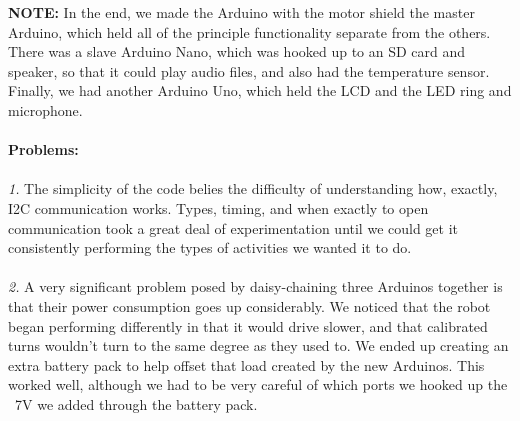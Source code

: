 \documentclass[paper=a4, fontsize=11pt]{scrartcl}
\numberwithin{equation}{section}		%
\numberwithin{figure}{section}			%
\numberwithin{table}{section}				%
\begin{document}
{\textbf{NOTE: }In the end, we made the Arduino with the motor shield the master Arduino,  which held all of the principle functionality separate from the others. There was a slave Arduino Nano, which was hooked up to an SD card and speaker, so that it could play audio files, and also had the temperature sensor. Finally, we had another Arduino Uno, which held the LCD and the LED ring and microphone.
\\\\
\textbf{Problems: }\\\\
\textit{1. } The simplicity of the code belies the difficulty of understanding how, exactly, I2C communication works. Types, timing, and when exactly to open communication took a great deal of experimentation until we could get it consistently performing the types of activities we wanted it to do.
\\\\
\textit{2. }A very significant problem posed by daisy-chaining three Arduinos together is that their power consumption goes up considerably. We noticed that the robot began performing differently in that it would drive slower, and that calibrated turns wouldn't turn to the same degree as they used to. We ended up creating an extra battery pack to help offset that load created by the new Arduinos. This worked well, although we had to be very careful of which ports we hooked up the ~7V we added through the battery pack.
}
\end{document}
